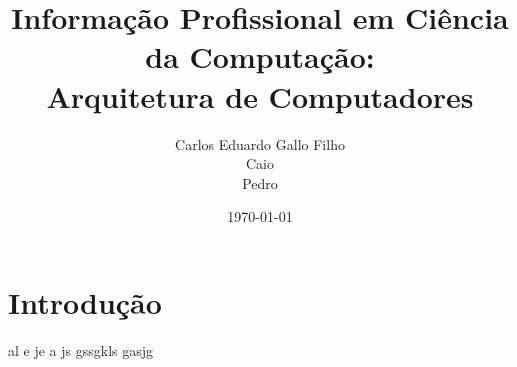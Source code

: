 \documentclass{article}
\title{Informação Profissional em Ciência da Computação:\\
	Arquitetura de Computadores}
\author{Carlos Eduardo Gallo Filho \\
	Caio \\
	Pedro}
\date{\today}
\begin{document}
\maketitle

\section{Introdução}
al e je a js gssgkls gasjg 
\end{document}
